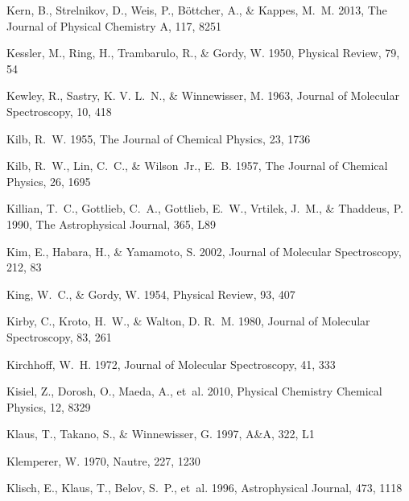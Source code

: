 \documentclass[twocolumn]{aastex631}
\begin{document}
\begin{thebibliography}{}
Kern, B., Strelnikov, D., Weis, P., B{\"o}ttcher, A., \& Kappes, M.~M. 2013,
  The Journal of Physical Chemistry A, 117, 8251

Kessler, M., Ring, H., Trambarulo, R., \& Gordy, W. 1950, Physical Review, 79,
  54

Kewley, R., Sastry, K. V. L.~N., \& Winnewisser, M. 1963, Journal of Molecular
  Spectroscopy, 10, 418

Kilb, R.~W. 1955, The Journal of Chemical Physics, 23, 1736

Kilb, R.~W., Lin, C.~C., \& Wilson~Jr., E.~B. 1957, The Journal of Chemical
  Physics, 26, 1695

Killian, T.~C., Gottlieb, C.~A., Gottlieb, E.~W., Vrtilek, J.~M., \& Thaddeus,
  P. 1990, The Astrophysical Journal, 365, L89

Kim, E., Habara, H., \& Yamamoto, S. 2002, Journal of Molecular Spectroscopy,
  212, 83

King, W.~C., \& Gordy, W. 1954, Physical Review, 93, 407

Kirby, C., Kroto, H.~W., \& Walton, D. R.~M. 1980, Journal of Molecular
  Spectroscopy, 83, 261

Kirchhoff, W.~H. 1972, Journal of Molecular Spectroscopy, 41, 333

Kisiel, Z., Dorosh, O., Maeda, A., {et~al.} 2010, Physical Chemistry Chemical
  Physics, 12, 8329

Klaus, T., Takano, S., \& Winnewisser, G. 1997, A{\&}A, 322, L1

Klemperer, W. 1970, Nautre, 227, 1230

Klisch, E., Klaus, T., Belov, S.~P., {et~al.} 1996, Astrophysical Journal, 473,
  1118


\end{thebibliography}
\end{document}
